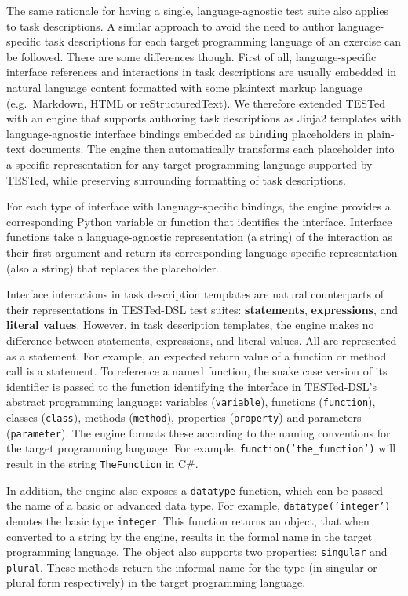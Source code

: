 \documentclass[../main]{subfiles}
\begin{document}
The same rationale for having a single, language-agnostic test suite also applies to task descriptions.
A similar approach to avoid the need to author language-specific task descriptions for each target programming language of an exercise can be followed.
There are some differences though.
First of all, language-specific interface references and interactions in task descriptions are usually embedded in natural language content formatted with some plaintext markup language (e.g.\ Markdown, HTML or reStructuredText).
We therefore extended TESTed with an engine that supports authoring task descriptions as Jinja2 templates\autocite{ronacherJinja} with language-agnostic interface bindings embedded as \texttt{{{binding}}} placeholders in plain-text documents.
The engine then automatically transforms each placeholder into a specific representation for any target programming language supported by TESTed, while preserving surrounding formatting of task descriptions.

For each type of interface with language-specific bindings, the engine provides a corresponding Python variable or function that identifies the interface.
Interface functions take a language-agnostic representation (a string) of the interaction as their first argument and return its corresponding language-specific representation (also a string) that replaces the placeholder.

Interface interactions in task description templates are natural counterparts of their representations in TESTed-DSL test suites: \textbf{statements}, \textbf{expressions}, and \textbf{literal values}.
However, in task description templates, the engine makes no difference between statements, expressions, and literal values.
All are represented as a statement.
For example, an expected return value of a function or method call is a statement.
To reference a named function, the snake case version of its identifier is passed to the function identifying the interface in TESTed-DSL's abstract programming language: variables (\texttt{variable}), functions (\texttt{function}), classes (\texttt{class}), methods (\texttt{method}), properties (\texttt{property}) and parameters (\texttt{parameter}).
The engine formats these according to the naming conventions for the target programming language.
For example, \texttt{function('the\_function')} will result in the string \texttt{TheFunction} in C\#.

In addition, the engine also exposes a \texttt{datatype} function, which can be passed the name of a basic or advanced data type.
For example, \texttt{datatype('integer')} denotes the basic type \texttt{integer}.
This function returns an object, that when converted to a string by the engine, results in the formal name in the target programming language.
The object also supports two properties: \texttt{singular} and \texttt{plural}.
These methods return the informal name for the type (in singular or plural form respectively) in the target programming language.
\end{document}
